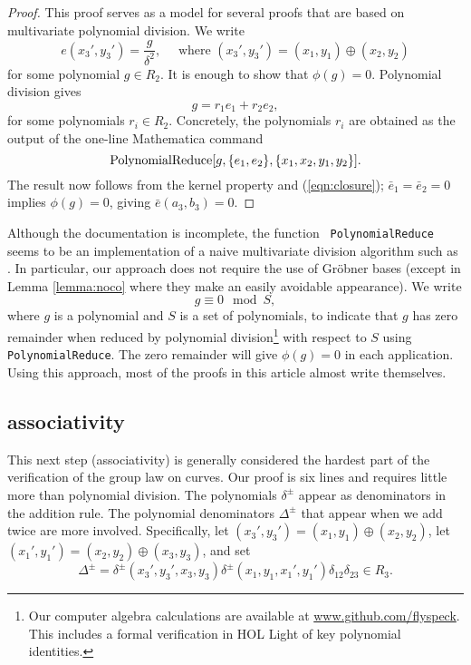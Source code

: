 \documentclass[12pt]{article}
\newcommand{\op}[1]{\hbox{#1}}
\def\cong{\equiv}
\begin{document}
\begin{proof} This proof serves as a model for several proofs that are
  based on multivariate polynomial division.  We write
\[
e(x_3',y_3') = \frac{g}{\delta^2},\quad \text{ where } 
(x_3',y_3')=(x_1,y_1) \oplus (x_2,y_2) 
\]
for some polynomial $g \in R_2$.  It is enough to show that $\phi(g)=0$.
Polynomial division gives
\begin{equation}\label{eqn:closure}
g= r_1 e_1 + r_2 e_2,
\end{equation}
for some polynomials $r_i\in R_2$.  Concretely, the polynomials $r_i$
are obtained as the output of the one-line Mathematica command
\[
\op{PolynomialReduce}[g,\{e_1,e_2\},\{x_1,x_2,y_1,y_2\}].
\]
The result now follows from the kernel
property and (\ref{eqn:closure}); $\bar e_1 = \bar e_2 = 0$ implies
$\phi(g)= 0$, giving ${\bar e}(a_3,b_3)=0$.
\end{proof}

Although the documentation is incomplete, the function {\tt
  PolynomialReduce} seems to be an implementation of a naive
multivariate division algorithm such as \cite{cox1992ideals}.  In
particular, our approach does not require the use of Gr\"obner bases
(except in Lemma \ref{lemma:noco} where they make an easily avoidable
appearance).  We write
\[
g \cong 0 \mod S,
\]
where $g$ is a polynomial and $S$ is a set of polynomials, to indicate
that $g$ has zero remainder when reduced by polynomial
division\footnote{Our computer algebra calculations are available at
  \url{www.github.com/flyspeck}.  This includes a formal verification
  in HOL Light of key polynomial identities.} with respect to $S$
using {\tt PolynomialReduce}.  The zero remainder will give
$\phi(g)=0$ in each application.  Using this approach, most of the
proofs in this article almost write themselves.


\subsection{associativity}

This next step (associativity) is generally considered the hardest
part of the verification of the group law on curves.  Our proof is six lines
and requires little more than polynomial division.  The polynomials
$\delta^\pm$ appear as denominators in the addition rule.  The
polynomial denominators $\Delta^\pm$ that appear when we add twice are
more involved.  Specifically, let $ (x_3',y_3')=(x_1,y_1) \oplus
(x_2,y_2)$, let $(x_1',y_1')=(x_2,y_2) \oplus (x_3,y_3) $, and set
\[
\Delta^{\pm} = \delta^\pm(x_3',y_3',x_3,y_3)
\delta^\pm(x_1,y_1,x_1',y_1')\delta_{12}\delta_{23}\in R_3.
\]
\end{document}
